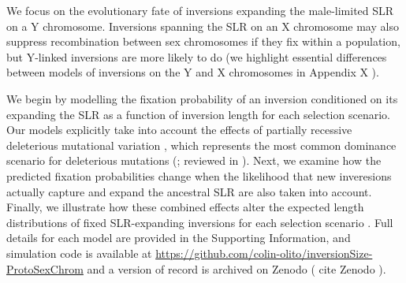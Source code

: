\documentclass{article}[12pt]
\newcommand\hl[1]{%
  \bgroup
  \hskip0pt\color{blue!80!black}%
  #1%
  \egroup
}
\begin{document}
We focus on the evolutionary fate of inversions expanding the male-limited SLR on a Y chromosome. Inversions spanning the SLR on an X chromosome may also suppress recombination between sex chromosomes if they fix within a population, but Y-linked inversions are more likely to do (we highlight essential differences between models of inversions on the Y and X chromosomes in \hl{Appendix X}). 

We begin by modelling the fixation probability of an inversion conditioned on its expanding the SLR as a function of inversion length for each selection scenario. Our models explicitly take into account the effects of partially recessive deleterious mutational variation \citep[after][]{Olito-etal-2022}, which represents the most common dominance scenario for deleterious mutations (\citealt{AgrawalWhitlock2012,Manna2011,Huber2018}; reviewed in \citealt{Billiard-etal-2021}). Next, we examine how the predicted fixation probabilities change when the likelihood that new inveresions actually capture and expand the ancestral SLR are also taken into account. Finally, we illustrate how these combined effects alter the expected length distributions of fixed SLR-expanding inversions for each selection scenario \citep[as in][]{ConnallonOlito2021}. Full details for each model are provided in the Supporting Information, and simulation code is available at \url{https://github.com/colin-olito/inversionSize-ProtoSexChrom} and a version of record is archived on Zenodo (\hl{cite Zenodo}).
\end{document}
